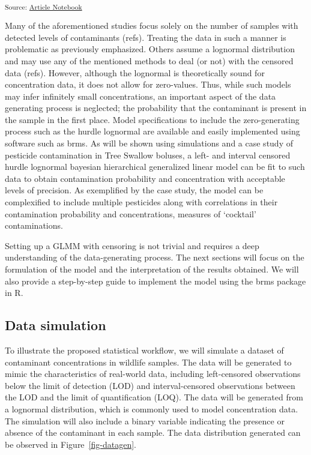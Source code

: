 \documentclass[
]{article}
\begin{document}
\textsubscript{Source:
\href{https://abushbeaupre.github.io/quantifying_pesticides/index.qmd.html}{Article
Notebook}}

Many of the aforementioned studies focus solely on the number of samples
with detected levels of contaminants (refs). Treating the data in such a
manner is problematic as previously emphasized. Others assume a
lognormal distribution and may use any of the mentioned methods to deal
(or not) with the censored data (refs). However, although the lognormal
is theoretically sound for concentration data, it does not allow for
zero-values. Thus, while such models may infer infinitely small
concentrations, an important aspect of the data generating process is
neglected; the probability that the contaminant is present in the sample
in the first place. Model specifications to include the zero-generating
process such as the hurdle lognormal are available and easily
implemented using software such as brms. As will be shown using
simulations and a case study of pesticide contamination in Tree Swallow
boluses, a left- and interval censored hurdle lognormal bayesian
hierarchical generalized linear model can be fit to such data to obtain
contamination probability and concentration with acceptable levels of
precision. As exemplified by the case study, the model can be
complexified to include multiple pesticides along with correlations in
their contamination probability and concentrations, measures of
`cocktail' contaminations.

Setting up a GLMM with censoring is not trivial and requires a deep
understanding of the data-generating process. The next sections will
focus on the formulation of the model and the interpretation of the
results obtained. We will also provide a step-by-step guide to implement
the model using the brms package in R.

\subsection{Data simulation}\label{data-simulation}

To illustrate the proposed statistical workflow, we will simulate a
dataset of contaminant concentrations in wildlife samples. The data will
be generated to mimic the characteristics of real-world data, including
left-censored observations below the limit of detection (LOD) and
interval-censored observations between the LOD and the limit of
quantification (LOQ). The data will be generated from a lognormal
distribution, which is commonly used to model concentration data. The
simulation will also include a binary variable indicating the presence
or absence of the contaminant in each sample. The data distribution
generated can be observed in Figure~\ref{fig-datagen}.
\end{document}
